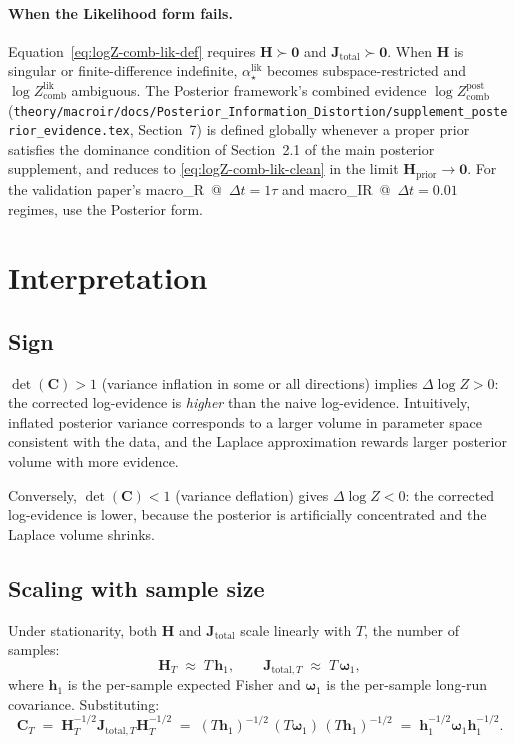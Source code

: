 \documentclass[11pt]{article}
\begin{document}
\paragraph{When the Likelihood form fails.}
Equation~\eqref{eq:logZ-comb-lik-def} requires $\mathbf H \succ \mathbf 0$
and $\mathbf J_{\mathrm{total}} \succ \mathbf 0$. When $\mathbf H$ is singular
or finite-difference indefinite, $\alpha_\star^{\mathrm{lik}}$ becomes
subspace-restricted and $\log Z_{\mathrm{comb}}^{\mathrm{lik}}$ ambiguous.
The Posterior framework's combined evidence
$\log Z_{\mathrm{comb}}^{\mathrm{post}}$
(\texttt{theory/macroir/docs/Posterior\_Information\_Distortion/supplement\_posterior\_evidence.tex},
Section~7) is defined globally whenever a proper prior satisfies the dominance
condition of Section~2.1 of the main posterior supplement, and reduces to
\eqref{eq:logZ-comb-lik-clean} in the limit $\mathbf H_{\mathrm{prior}} \to
\mathbf 0$. For the validation paper's macro\_R~@~$\Delta t = 1\tau$ and
macro\_IR~@~$\Delta t = 0.01$ regimes, use the Posterior form.


\section{Interpretation}
\label{sec:interpretation}

\subsection{Sign}

$\det(\mathbf C) > 1$ (variance inflation in some or all directions) implies $\Delta\log Z > 0$: the corrected log-evidence is \emph{higher} than the naive log-evidence. Intuitively, inflated posterior variance corresponds to a larger volume in parameter space consistent with the data, and the Laplace approximation rewards larger posterior volume with more evidence.

Conversely, $\det(\mathbf C) < 1$ (variance deflation) gives $\Delta\log Z < 0$: the corrected log-evidence is lower, because the posterior is artificially concentrated and the Laplace volume shrinks.

\subsection{Scaling with sample size}

Under stationarity, both $\mathbf H$ and $\mathbf J_{\mathrm{total}}$ scale linearly with $T$, the number of samples:
\begin{equation}
\mathbf H_T \;\approx\; T\,\mathbf h_1,
\qquad
\mathbf J_{\mathrm{total},T} \;\approx\; T\,\boldsymbol\omega_1,
\end{equation}
where $\mathbf h_1$ is the per-sample expected Fisher and $\boldsymbol\omega_1$ is the per-sample long-run covariance. Substituting:
\begin{equation}
\mathbf C_T
\;=\;
\mathbf H_T^{-1/2}\mathbf J_{\mathrm{total},T}\mathbf H_T^{-1/2}
\;=\;
(T\mathbf h_1)^{-1/2}\,(T\boldsymbol\omega_1)\,(T\mathbf h_1)^{-1/2}
\;=\;
\mathbf h_1^{-1/2}\boldsymbol\omega_1\mathbf h_1^{-1/2}.
\end{equation}
\end{document}
